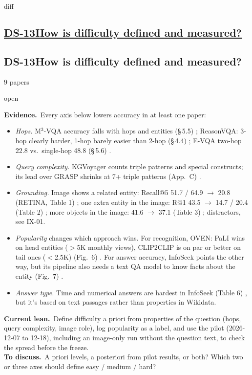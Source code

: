 \documentclass[10pt,a4paper]{article}
\newcommand{\st}[2]{\colorbox{#1}{\footnotesize\strut #2}}
\newcommand{\open}{\st{red!15}{open}}
\newcommand{\qblock}[1][]{\def\qkey{#1}\qblockx}
\newcommand{\qblockx}[4]{%
  \ifx\qkey\empty
  \subsection*{\underline{#1\quad #2}}%
  \else\hypertarget{\qkey}{}
  \subsection*{#1\quad #2}\fi%
{\footnotesize #3 papers\quad}#4\par}
\newcommand{\ev}{\textbf{Evidence.}}
\newcommand{\lean}{\textbf{Current lean.}}
\newcommand{\ask}{\textbf{To discuss.}}
\begin{document}
\qblock[diff]{DS-13}{How is difficulty defined and measured?}{9}{\open}
\ev\ Every axis below lowers accuracy in at least one paper:
\begin{itemize}
  \item \emph{Hops.} M$^3$-VQA accuracy falls with hops and entities
    (\S\,5.5) \cite{ma2026m3}; ReasonVQA: 3-hop clearly harder, 1-hop barely
    easier than 2-hop (\S\,4.4) \cite{tran2025reasonvqa}; E-VQA two-hop 22.8
    vs.\ single-hop 48.8 (\S\,5.6) \cite{mensink2023encyclopedic}.
  \item \emph{Query complexity.} KGVoyager counts triple patterns and
    special constructs; its lead over GRASP shrinks at 7+ triple patterns
    (App.~C) \cite{wisam2026kgvoyager}.
  \item \emph{Grounding.} Image shows a related entity: Recall@5 51.7 / 64.9
    $\to$ 20.8 (RETINA, Table 1) \cite{lee2025breaking}; one extra entity in
    the image: R@1 43.5 $\to$ 14.7 / 20.4 (Table 2) \cite{ma2026identifying};
    more objects in the image: 41.6 $\to$ 37.1 (Table 3)
    \cite{jian2024large}; distractors, see IX-01.
  \item \emph{Popularity} changes which approach wins. For recognition, OVEN:
    PaLI wins on head entities ($>$5K monthly views), CLIP2CLIP is on par or
    better on tail ones ($<$2.5K) (Fig.~6) \cite{hu2023open}. For answer
    accuracy, InfoSeek points the other way, but its pipeline also needs a
    text QA model to know facts about the entity (Fig.~7) \cite{chen2023can}.
  \item \emph{Answer type.} Time and numerical answers are hardest in InfoSeek
    (Table 6) \cite{chen2023can}, but it's based on text passages
    rather than properties in Wikidata.
\end{itemize}
\lean\ Define difficulty a priori from properties of the question
(hops, query complexity, image role), log popularity as a label, and use
the pilot (2026-12-07 to 12-18), including an image-only run without the
question text, to check the spread before the freeze.\\
\ask\ A priori levels, a posteriori from pilot results, or both? Which
two or three axes should define easy / medium / hard?
\end{document}
